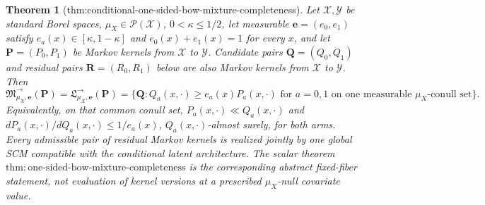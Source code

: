 \documentclass{article}
\newtheorem{theorem}{Theorem}
\begin{document}
\begin{theorem}[thm:conditional-one-sided-bow-mixture-completeness]\label{thm:conditional-one-sided-bow-mixture-completeness}
Let \(\mathcal X,\mathcal Y\) be standard Borel spaces, \(\mu_X\in\mathcal P(\mathcal X)\), \(0<\kappa\le1/2\), let measurable \(\boldsymbol e=(e_0,e_1)\) satisfy \(e_a(x)\in[\kappa,1-\kappa]\) and \(e_0(x)+e_1(x)=1\) for every \(x\), and let \(\boldsymbol P=(P_0,P_1)\) be Markov kernels from \(\mathcal X\) to \(\mathcal Y\).  Candidate pairs \(\boldsymbol Q=(Q_0,Q_1)\) and residual pairs \(\boldsymbol R=(R_0,R_1)\) below are also Markov kernels from \(\mathcal X\) to \(\mathcal Y\).  Then
\[
 \mathfrak M^{\to}_{\mu_X,\boldsymbol e}(\boldsymbol P)
 =\mathfrak L^{\to}_{\mu_X,\boldsymbol e}(\boldsymbol P)
 =\{\boldsymbol Q:Q_a(x,\cdot)\ge e_a(x)P_a(x,\cdot)\text{ for }a=0,1\text{ on one measurable }\mu_X\text{-conull set}\}.
\]
Equivalently, on that common conull set, \(P_a(x,\cdot)\ll Q_a(x,\cdot)\) and \(dP_a(x,\cdot)/dQ_a(x,\cdot)\le1/e_a(x)\), \(Q_a(x,\cdot)\)-almost surely, for both arms.  Every admissible pair of residual Markov kernels is realized jointly by one global SCM compatible with the conditional latent architecture.  The scalar theorem \(\mathrm{thm:one\text{-}sided\text{-}bow\text{-}mixture\text{-}completeness}\) is the corresponding abstract fixed-fiber statement, not evaluation of kernel versions at a prescribed \(\mu_X\)-null covariate value.
\end{theorem}
\end{document}
